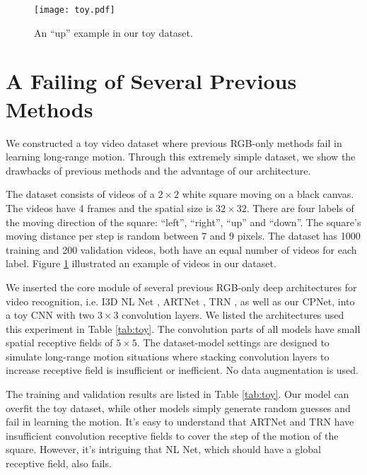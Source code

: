 \documentclass[10pt,twocolumn,letterpaper]{article}
\begin{document}
\begin{figure}[t]
\captionsetup{position=bottom}
\centering
\texttt{[image: toy.pdf]}
\vspace{-2ex}
\caption{An ``up'' example in our toy dataset.} 
\label{fig:toy:viz}
\vspace{-1ex}
\end{figure}






\section{A Failing of Several Previous Methods}


We constructed a toy video dataset where previous RGB-only methods fail in learning long-range motion. Through this extremely simple dataset, we show the drawbacks of previous methods and the advantage of our architecture.


The dataset consists of videos of a $2\times 2$ white square moving on a black canvas. The videos have 4 frames and the spatial size is $32\times 32$. There are four labels of the moving direction of the square: ``left'', ``right'', ``up'' and ``down''. The square's moving distance per step is random between 7 and 9 pixels. The dataset has 1000 training and 200 validation videos, both have an equal number of videos for each label. Figure \ref{fig:toy:viz} illustrated an example of videos in our dataset.

We inserted the core module of several previous RGB-only deep architectures for video recognition, i.e. I3D NL Net \cite{NLNet}, ARTNet \cite{ARTNet}, TRN \cite{TRN}, as well as our CPNet, into a toy CNN with two $3\times3$ convolution layers. We listed the architectures used this experiment in Table \ref{tab:toy}. The convolution parts of all models have small spatial receptive fields of $5\times5$. The dataset-model settings are designed to simulate long-range motion situations where stacking convolution layers to increase receptive field is insufficient or inefficient.
No data augmentation is used. 

The training and validation results are listed in Table \ref{tab:toy}. Our model can overfit the toy dataset, while other models simply generate random guesses and fail in learning the motion.
It's easy to understand that ARTNet and TRN have insufficient convolution receptive fields to cover the step of the motion of the square. However, it's intriguing that NL Net, which should have a global receptive field, also fails. 
\end{document}
